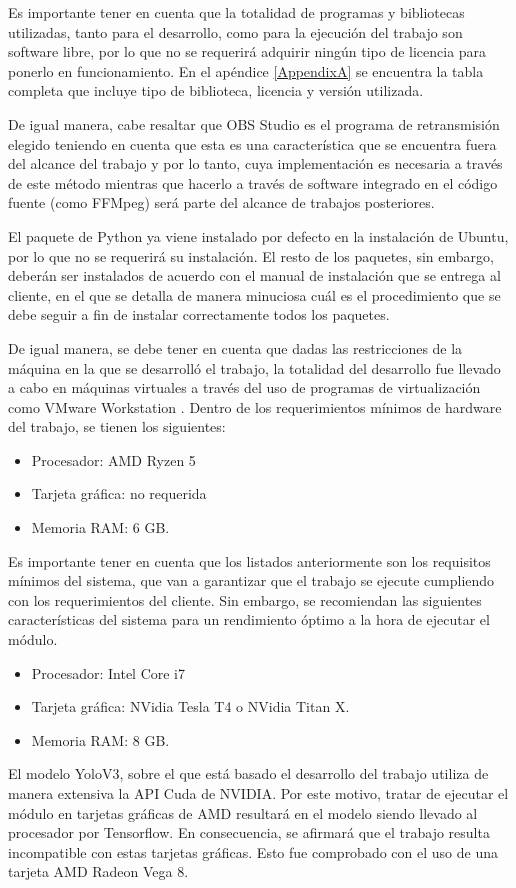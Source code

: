 Es importante tener en cuenta que la totalidad de programas y bibliotecas utilizadas, tanto para el desarrollo, como para la ejecución del trabajo son software libre, por lo que no se requerirá adquirir ningún tipo de licencia para ponerlo en funcionamiento. En el apéndice \ref{AppendixA} se encuentra la tabla completa que incluye tipo de biblioteca, licencia y versión utilizada.

De igual manera, cabe resaltar que OBS Studio es el programa de retransmisión elegido teniendo en cuenta que esta es una característica que se encuentra fuera del alcance del trabajo y por lo tanto, cuya implementación es necesaria a través de este método mientras que hacerlo a través de software integrado en el código fuente (como FFMpeg) será parte del alcance de trabajos posteriores. 

El paquete de Python ya viene instalado por defecto en la instalación de Ubuntu, por lo que no se requerirá su instalación. El resto de los paquetes, sin embargo, deberán ser instalados de acuerdo con el manual de instalación que se entrega al cliente, en el que se detalla de manera minuciosa cuál es el procedimiento que se debe seguir a fin de instalar correctamente todos los paquetes. 

De igual manera, se debe tener en cuenta que dadas las restricciones de la máquina en la que se desarrolló el trabajo, la totalidad del desarrollo fue llevado a cabo en máquinas virtuales a través del uso de programas de virtualización como VMware Workstation \cite{7}. 
Dentro de los requerimientos mínimos de hardware del trabajo, se tienen los siguientes:

\begin{itemize}

	\item Procesador: AMD Ryzen 5
	\item Tarjeta gráfica: no requerida
	\item Memoria RAM: 6 GB. 

\end{itemize}

Es importante tener en cuenta que los listados anteriormente son los requisitos mínimos del sistema, que van a garantizar que el trabajo se ejecute cumpliendo con los requerimientos del cliente. Sin embargo, se recomiendan las siguientes características del sistema para un rendimiento óptimo a la hora de ejecutar el módulo.

\begin{itemize}

	\item Procesador: Intel Core i7
	\item Tarjeta gráfica: NVidia Tesla T4 o NVidia Titan X.
	\item Memoria RAM: 8 GB. 

\end{itemize}

El modelo YoloV3, sobre el que está basado el desarrollo del trabajo utiliza de manera extensiva la API Cuda de NVIDIA. Por este motivo, tratar de ejecutar el módulo en tarjetas gráficas de AMD resultará en el modelo siendo llevado al procesador por Tensorflow. En consecuencia, se afirmará que el trabajo resulta incompatible con estas tarjetas gráficas. Esto fue comprobado con el uso de una tarjeta AMD Radeon Vega 8. 